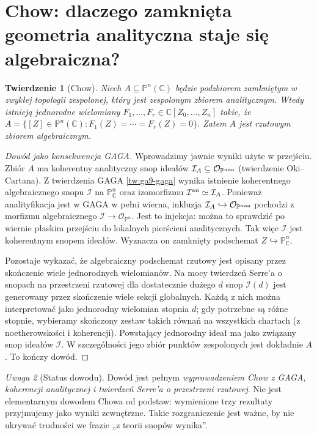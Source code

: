 \documentclass[11pt,a4paper,openany]{report}
\numberwithin{equation}{section}
\theoremstyle{plain}
\newtheorem{twierdzenie}{Twierdzenie}[section]
\theoremstyle{definition}
\theoremstyle{remark}
\newtheorem{uwaga}[twierdzenie]{Uwaga}
\newcommand{\C}{\mathbb C}
\newcommand{\PP}{\mathbb P}
\begin{document}
\section{Chow: dlaczego zamknięta geometria analityczna staje się algebraiczna?}
\label{sec:ga9-chow}

\begin{twierdzenie}[Chow]
\label{tw:ga9-chow}
Niech $A\subseteq\PP^n(\C)$ będzie podzbiorem
zamkniętym w zwykłej topologii zespolonej, który
jest zespolonym zbiorem analitycznym. Wtedy istnieją
jednorodne wielomiany $F_1,\ldots,F_r\in\C[Z_0,\ldots,Z_n]$
takie, że
$A=\{[Z]\in\PP^n(\C):F_1(Z)=\cdots=F_r(Z)=0\}$.
Zatem $A$ jest rzutowym zbiorem algebraicznym.
\end{twierdzenie}
\begin{proof}[Dowód jako konsekwencja GAGA]
Wprowadzimy jawnie wyniki użyte w przejściu.
Zbiór $A$ ma koherentny analityczny snop ideałów
$\mathcal I_A\subseteq\mathcal O_{\PP^n{}^{\rm an}}$
(twierdzenie Oki--Cartana). Z twierdzenia GAGA
\ref{tw:ga9-gaga} wynika istnienie koherentnego
algebraicznego snopu $\mathcal I$ na $\PP^n_\C$
oraz izomorfizmu $\mathcal I^{\rm an}\simeq\mathcal I_A$.
Ponieważ analityfikacja jest w GAGA w pełni wierna,
inkluzja $\mathcal I_A\hookrightarrow\mathcal O_{\PP^n{}^{\rm an}}$
pochodzi z morfizmu algebraicznego
$\mathcal I\to\mathcal O_{\PP^n}$. Jest to injekcja:
można to sprawdzić po wiernie płaskim przejściu do
lokalnych pierścieni analitycznych. Tak więc
$\mathcal I$ jest koherentnym snopem ideałów.
Wyznacza on zamknięty podschemat
$Z\hookrightarrow\PP^n_\C$.

Pozostaje wykazać, że algebraiczny podschemat rzutowy
jest opisany przez skończenie wiele jednorodnych
wielomianów. Na mocy twierdzeń Serre'a o snopach
na przestrzeni rzutowej dla dostatecznie dużego $d$
snop $\mathcal I(d)$ jest generowany przez skończenie
wiele sekcji globalnych. Każdą z nich można
interpretować jako jednorodny wielomian stopnia $d$;
gdy potrzebne są różne stopnie, wybieramy skończony
zestaw takich równań na wszystkich chartach
(z noetherowskości i koherencji). Powstający
jednorodny ideał ma jako związany snop ideałów
$\mathcal I$. W szczególności jego zbiór punktów
zespolonych jest dokładnie $A$. To kończy dowód.
\end{proof}

\begin{uwaga}[Status dowodu]
Dowód jest pełnym \emph{wyprowadzeniem Chow z GAGA,
koherencji analitycznej i twierdzeń Serre'a o przestrzeni
rzutowej}. Nie jest elementarnym dowodem Chowa od podstaw:
wymienione trzy rezultaty przyjmujemy jako wyniki zewnętrzne.
Takie rozgraniczenie jest ważne, by nie ukrywać trudności
we frazie „z teorii snopów wynika”.
\end{uwaga}
\end{document}
